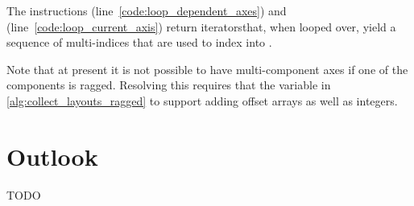 \documentclass[thesis]{subfiles}
\begin{document}
The instructions  (line~\ref{code:loop_dependent_axes}) and  (line~\ref{code:loop_current_axis}) return iterators\footnotemark that, when looped over, yield a sequence of multi-indices that are used to index into .


Note that at present it is not possible to have multi-component axes if one of the components is ragged.
Resolving this requires that the  variable in \cref{alg:collect_layouts_ragged} to support adding offset arrays as well as integers.

\section{Outlook}

TODO
\end{document}
